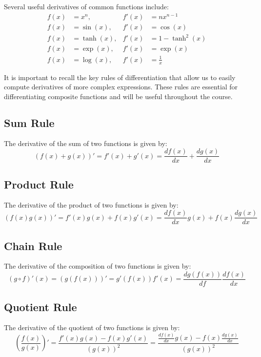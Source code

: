 Several useful derivatives of common functions include:
\begin{align*}
    f(x) & = x^n,      & f'(x) & = n x^{n-1}      \\
    f(x) & = \sin(x),  & f'(x) & = \cos(x)        \\
    f(x) & = \tanh(x), & f'(x) & = 1 - \tanh^2(x) \\
    f(x) & = \exp(x),  & f'(x) & = \exp(x)        \\
    f(x) & = \log(x),  & f'(x) & = \frac{1}{x}
\end{align*}

It is important to recall the key rules of differentiation that allow us to easily compute derivatives of more complex expressions. These rules are essential for differentiating composite functions and will be useful throughout the course.

\subsection{Sum Rule}
The derivative of the sum of two functions is given by:
\begin{equation}
    (f(x) + g(x))' = f'(x) + g'(x) = \frac{df(x)}{dx} + \frac{dg(x)}{dx}
\end{equation}

\subsection{Product Rule}
The derivative of the product of two functions is given by:
\begin{equation}
    (f(x)g(x))' = f'(x)g(x) + f(x)g'(x) = \frac{df(x)}{dx} g(x) + f(x) \frac{dg(x)}{dx}
\end{equation}

\subsection{Chain Rule}
The derivative of the composition of two functions is given by:
\begin{equation}
    (g \circ f)'(x) = (g(f(x)))' = g'(f(x)) f'(x) = \frac{dg(f(x))}{df} \frac{df(x)}{dx}
\end{equation}

\subsection{Quotient Rule}
The derivative of the quotient of two functions is given by:
\begin{equation}
    \left( \frac{f(x)}{g(x)} \right)' = \frac{f'(x)g(x) - f(x)g'(x)}{(g(x))^2} = \frac{\frac{df(x)}{dx} g(x) - f(x) \frac{dg(x)}{dx}}{(g(x))^2}
\end{equation}

